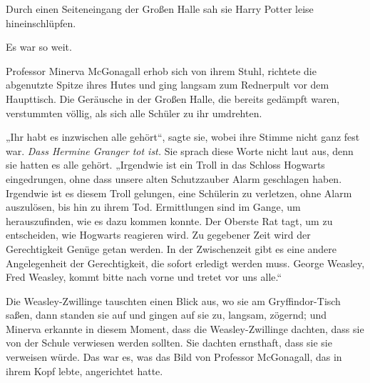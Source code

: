 Durch einen Seiteneingang der Großen Halle sah sie Harry Potter leise hineinschlüpfen.

Es war so weit.

Professor Minerva McGonagall erhob sich von ihrem Stuhl, richtete die abgenutzte Spitze ihres Hutes und ging langsam zum Rednerpult vor dem Haupttisch.
Die Geräusche in der Großen Halle, die bereits gedämpft waren, verstummten völlig, als sich alle Schüler zu ihr umdrehten.

„Ihr habt es inzwischen alle gehört“, sagte sie, wobei ihre Stimme nicht ganz fest war. \emph{Dass Hermine Granger tot ist.} Sie sprach diese Worte nicht laut aus, denn sie hatten es alle gehört.
„Irgendwie ist ein Troll in das Schloss Hogwarts eingedrungen, ohne dass unsere alten Schutzzauber Alarm geschlagen haben. Irgendwie ist es diesem Troll gelungen, eine Schülerin zu verletzen, ohne Alarm auszulösen, bis hin zu ihrem Tod. Ermittlungen sind im Gange, um herauszufinden, wie es dazu kommen konnte. Der Oberste Rat tagt, um zu entscheiden, wie Hogwarts reagieren wird. Zu gegebener Zeit wird der Gerechtigkeit Genüge getan werden. In der Zwischenzeit gibt es eine andere Angelegenheit der Gerechtigkeit, die sofort erledigt werden muss. George Weasley, Fred Weasley, kommt bitte nach vorne und tretet vor uns alle.“

Die Weasley-Zwillinge tauschten einen Blick aus, wo sie am Gryffindor-Tisch saßen, dann standen sie auf und gingen auf sie zu, langsam, zögernd; und Minerva erkannte in diesem Moment, dass die Weasley-Zwillinge dachten, dass sie von der Schule verwiesen werden sollten.
Sie dachten ernsthaft, dass sie sie verweisen würde.
Das war es, was das Bild von Professor McGonagall, das in ihrem Kopf lebte, angerichtet hatte.

